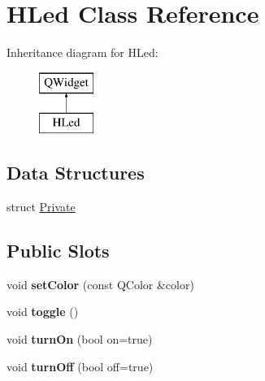 \hypertarget{class_h_led}{}\section{H\+Led Class Reference}
\label{class_h_led}
Inheritance diagram for H\+Led\+:\begin{figure}[H]
\begin{center}
\leavevmode
\includegraphics[height=2.000000cm]{class_h_led}
\end{center}
\end{figure}
\subsection*{Data Structures}
\begin{DoxyCompactItemize}
\item 
struct \mbox{\hyperlink{struct_h_led_1_1_private}{Private}}
\end{DoxyCompactItemize}
\subsection*{Public Slots}
\begin{DoxyCompactItemize}
\item 
\mbox{\label{class_h_led_a858bbcf98637471449e438304a00624b}} 
void {\bfseries set\+Color} (const Q\+Color \&color)
\item 
\mbox{\label{class_h_led_ad277193b2dca0bab1e0ad24d45407dc3}} 
void {\bfseries toggle} ()
\item 
\mbox{\label{class_h_led_a617b080528b03468d155c26a85944aff}} 
void {\bfseries turn\+On} (bool on=true)
\item 
\mbox{\label{class_h_led_a462a72e340c02d3b38c114bedaf38d86}} 
void {\bfseries turn\+Off} (bool off=true)
\end{DoxyCompactItemize}

